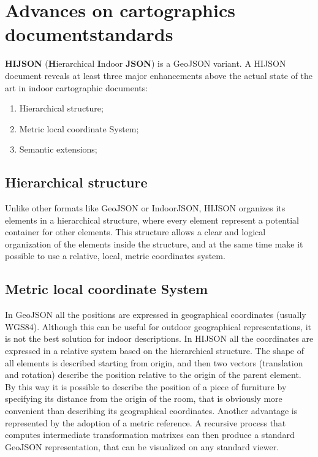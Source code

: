 \documentclass{sig-alternate}
\begin{document}
\section{Advances on cartographics documentstandards}\label{advances-on-cartographics-document-standards}

\textbf{HIJSON} (\textbf{H}ierarchical \textbf{I}ndoor \textbf{JSON}) is a GeoJSON variant. A HIJSON document reveals at least three major enhancements above the actual state of the art in indoor cartographic documents:
\begin{enumerate}
\def\labelenumi{\arabic{enumi}.}
\itemsep1pt\parskip0pt
\item
  Hierarchical structure;
\item
  Metric local coordinate System;
\item
  Semantic extensions;
\end{enumerate}

\subsection{Hierarchical structure}\label{hierarchical-structure}

Unlike other formats like GeoJSON or IndoorJSON, HIJSON organizes its elements in a hierarchical structure, where every element represent a potential container for other elements. This structure allows a clear and logical organization of the elements inside the structure, and at the same time make it possible to use a relative, local, metric coordinates system.

\subsection{Metric local coordinate System}\label{metric-local-coordinate-system}

In GeoJSON all the positions are expressed in geographical coordinates (usually WGS84). Although this can be useful for outdoor geographical representations, it is not the best solution for indoor descriptions. In HIJSON all the coordinates are expressed in a relative system based on the hierarchical structure. The shape of all elements is described starting from origin, and then two vectors (translation and rotation) describe the position relative to the origin of the parent element. By this way it is possible to describe the position of a piece of furniture by specifying its distance from the origin of the room, that is obviously more convenient than describing its geographical coordinates. Another advantage is represented by the adoption of a metric reference. A recursive process that computes intermediate transformation matrixes can then produce a standard GeoJSON representation, that can be visualized on any standard viewer.
\end{document}
